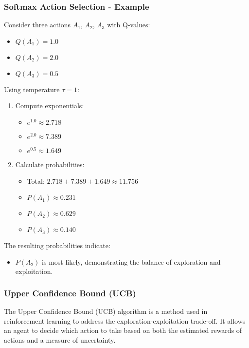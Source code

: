 \documentclass[aspectratio=169]{beamer}
\begin{document}
\begin{frame}[fragile]
    \frametitle{Softmax Action Selection - Example}
    Consider three actions \(A_1\), \(A_2\), \(A_3\) with Q-values:
    \begin{itemize}
        \item \(Q(A_1) = 1.0\)
        \item \(Q(A_2) = 2.0\)
        \item \(Q(A_3) = 0.5\)
    \end{itemize}
    
    Using temperature \(\tau = 1\):
    
    \begin{enumerate}
        \item Compute exponentials:
            \begin{itemize}
                \item \(e^{1.0} \approx 2.718\)
                \item \(e^{2.0} \approx 7.389\)
                \item \(e^{0.5} \approx 1.649\)
            \end{itemize}
        \item Calculate probabilities:
            \begin{itemize}
                \item Total: \(2.718 + 7.389 + 1.649 \approx 11.756\)
                \item \(P(A_1) \approx 0.231\)
                \item \(P(A_2) \approx 0.629\)
                \item \(P(A_3) \approx 0.140\)
            \end{itemize}
    \end{enumerate}
    
    The resulting probabilities indicate:
    \begin{itemize}
        \item \(P(A_2)\) is most likely, demonstrating the balance of exploration and exploitation.
    \end{itemize}
\end{frame}

\begin{frame}[fragile]
    \frametitle{Upper Confidence Bound (UCB)}
    The Upper Confidence Bound (UCB) algorithm is a method used in reinforcement learning to address the exploration-exploitation trade-off. It allows an agent to decide which action to take based on both the estimated rewards of actions and a measure of uncertainty.
\end{frame}
\end{document}
